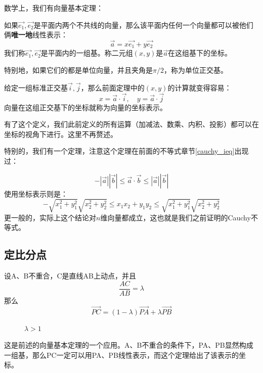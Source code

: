 数学上，我们有向量基本定理：
\begin{theorem}
    如果$\Vec{e_1}, \Vec{e_2}$是平面内两个不共线的向量，那么该平面内任何一个向量都可以被他们俩\textbf{唯一地}线性表示：
    $$
        \Vec{a} = x\Vec{e_1} + y \Vec{e_2}
    $$
    我们称$\Vec{e_1}, \Vec{e_2}$是平面内的一组基。称二元组$(x,y)$是$\Vec{a}$在这组基下的坐标。

    特别地，如果它们的都是单位向量，并且夹角是$\pi / 2$，称为单位正交基。
\end{theorem}

\begin{definition}[平面直角坐标]
    给定一组标准正交基$\Vec{i},\Vec{j}$，那么前面定理中的$(x,y)$的计算就变得容易：
    $$
        x = \Vec{a} \cdot \Vec{i}, \quad y = \Vec{a} \cdot \Vec{j}
    $$
    向量在这组正交基下的坐标就称为向量的坐标表示。
\end{definition}
有了这个定义，我们此前定义的所有运算（加减法、数乘、内积、投影）都可以在坐标的视角下进行。这里不再赘述。

特别的，我们有一个定理，注意这个定理在前面的不等式章节\ref{cauchy_ieq}出现过：
\begin{theorem}[Cauchy不等式]
    $$
        -|\Vec{a}||\Vec{b}| \le \Vec{a} \cdot \Vec{b} \le |\Vec{a}||\Vec{b}|
    $$
    使用坐标表示则是：
    $$
        -\sqrt{x_1^2+y_1^2}\sqrt{x_2^2+y_2^2} \le x_1x_2 + y_1y_2 \le \sqrt{x_1^2+y_1^2}\sqrt{x_2^2+y_2^2}
    $$
    更一般的，实际上这个结论对$n$维向量都成立，这也就是我们之前证明的Cauchy不等式。
\end{theorem}
\subsection{定比分点}
\begin{theorem}[定比分点]
    设A、B不重合，C是直线AB上动点，并且
    $$
        \frac{AC}{AB} = \lambda
    $$
    那么
    $$
        \Vec{PC} = (1-\lambda) \Vec{PA} +   \lambda \Vec{PB}
    $$
\end{theorem}

\begin{figure}[H]
    \centering
    \caption{$\lambda > 1$}
\end{figure}
这是前述的向量基本定理的一个应用。A、B不重合的条件下，PA、PB显然构成一组基，那么PC一定可以用PA、PB线性表示，而这个定理给出了该表示的坐标。

